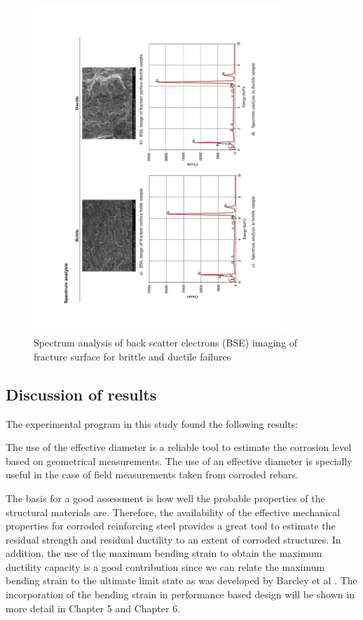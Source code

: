 \begin{figure}[htbp]
	\centering
	\includegraphics[width=0.85\textwidth]{VAC Thesis 2.0/Chapter-4/figs/BBT_SpectrumAnalysis.pdf}
	\caption{Spectrum analysis of back scatter electrons (BSE) imaging of fracture surface for brittle and ductile failures}
	\label{fig:SpectrumAnalysis}
\end{figure}

\subsection{Discussion of results}

The experimental program in this study found the following results:

The use of the effective diameter is a reliable tool to estimate the corrosion level based on geometrical measurements. The use of an effective diameter is specially useful in the case of field measurements taken from corroded rebars. 

The basis for a good assessment is how well the probable properties of the structural materials are. Therefore, the availability of the effective mechanical properties for corroded reinforcing steel provides a great tool to estimate the residual strength and residual ductility to an extent of corroded structures. In addition, the use of the maximum bending strain to obtain the maximum ductility capacity is a good contribution since we can relate the maximum bending strain to the ultimate limit state as was developed by Barcley et al \cite{Barcley2018}. The incorporation of the bending strain in performance based design will be shown in more detail in Chapter 5 and Chapter 6. 

